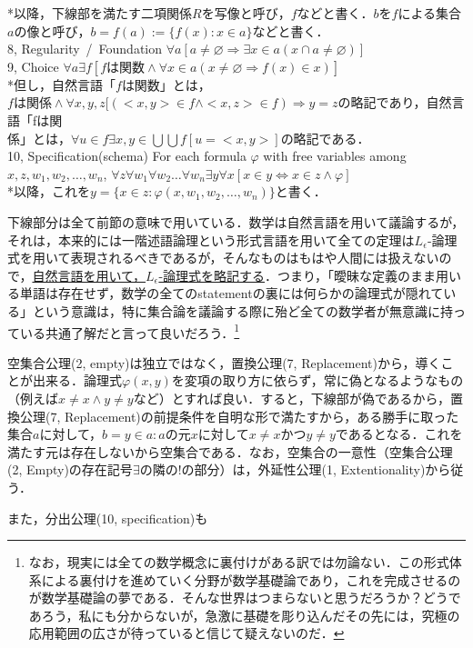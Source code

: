 \documentclass[uplatex, 12pt, a4paper, dvipdfmx]{jsreport}
\begin{document}
\begin{shadebox}
\begin{definition}
	\hspace{5mm}*以降，下線部を満たす二項関係$R$を写像と呼び，$f$などと書く．$b$を$f$による集合$a$の像と呼び，$b=f(a):=\{ f(x) : x\in a \}$などと書く．\\
	8, \rm{Regularity\, /\, Foundation}   $\forall a [a\neq \varnothing \Longrightarrow \exists x\in a (x\cap a \neq \varnothing )] $\\
	9, \rm{Choice}   $\forall a \exists f [fは関数 \wedge \forall x\in a (x\neq \varnothing \Longrightarrow f(x)\in x)]$\\
	\hspace{5mm}*但し，自然言語「$f$は関数」とは，$fは関係 \wedge \forall x,y,z[(<x,y>\in f \wedge <x,z>\in f ) \Longrightarrow y=z$の略記であり，自然言語「fは関\\ \hspace{5mm}係」とは，$\forall u \in f \exists x,y \in \bigcup \bigcup f[u=<x,y>]$の略記である．\\
	10, \rm{Specification(schema)} \; \rm{For each formula $\varphi$ with free variables among} $x,z,w_1,w_2,\dots,w_n$, $\forall z \forall w_1 \forall w_2 \dots \forall w_n \exists y \forall x [x\in y \Longleftrightarrow x\in z \wedge \varphi]$ \\
	\hspace{5mm}*以降，これを$y=\{ x\in z: \varphi (x,w_1,w_2,\dots ,w_n)\}$と書く．
\end{definition}	
\end{shadebox}

下線部分は全て前節の意味で用いている．数学は自然言語を用いて議論するが，それは，本来的には一階述語論理という形式言語を用いて全ての定理は$L_\epsilon$-論理式を用いて表現されるべきであるが，そんなものはもはや人間には扱えないので，\underline{自然言語を用いて，$L_\epsilon$-論理式を略記する}．つまり，「曖昧な定義のまま用いる単語は存在せず，数学の全てのstatementの裏には何らかの論理式が隠れている」という意識は，特に集合論を議論する際に殆ど全ての数学者が無意識に持っている共通了解だと言って良いだろう．\footnote{なお，現実には全ての数学概念に裏付けがある訳では勿論ない．この形式体系による裏付けを進めていく分野が数学基礎論であり，これを完成させるのが数学基礎論の夢である．そんな世界はつまらないと思うだろうか？どうであろう，私にも分からないが，急激に基礎を彫り込んだその先には，究極の応用範囲の広さが待っていると信じて疑えないのだ．}

空集合公理(2, empty)は独立ではなく，置換公理(7, Replacement)から，導くことが出来る．論理式$\varphi (x,y)$を変項の取り方に依らず，常に偽となるようなもの（例えば$x\neq x \wedge y\neq y$など）とすれば良い．すると，下線部が偽であるから，置換公理(7, Replacement)の前提条件を自明な形で満たすから，ある勝手に取った集合$a$に対して，$b={y\in a : aの元xに対して x\neq x かつ y\neq yである}$となる．これを満たす元は存在しないから空集合である．なお，空集合の一意性（空集合公理(2, Empty)の存在記号$\exists$の隣の!の部分）は，外延性公理(1, Extentionality)から従う．\par
また，分出公理(10, specification)も
\end{document}
